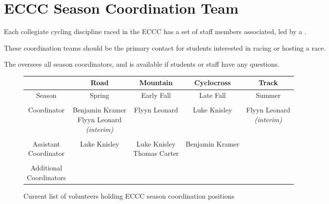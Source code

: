 \section[ECCC Season Team]{ECCC Season Coordination Team}
\label{role:eccc_coordination_team}

Each collegiate cycling discipline raced in the ECCC has a set of staff members associated, led by
a .

These coordination teams should be the primary contact for students interested in racing or hosting a race.

The  oversees all season coordinators, and is available if students or staff have any questions.

\begin{figure*}[h!]
  \caption{Current list of volunteers holding ECCC season coordination positions}
  \begin{tabular}{c | c | c | c | c}
    \toprule
    &
    Road &
    Mountain &
    Cyclocross & Track
    \\
    \midrule
    Season &
    Spring &
    Early Fall &
    Late Fall &
    Summer \\

    \midrule \\

    Coordinator &
    \makecell{Benjamin Kramer \\ Flyyn Leonard\\\textit{(interim)}} &
    Flyyn Leonard
    & Luke Knisley
    & \makecell{Flyyn Leonard\\\textit{(interim)}} \\

    \midrule \\

    \makecell{Assistant\\Coordinator} &
    Luke Knisley &
    \makecell{Luke Knisley \\ Thomas Carter} &
    Benjamin Kramer & \\

    \midrule \\

    \makecell{Additional\\Coordinators} & & & & \\

    \bottomrule
  \end{tabular}
\end{figure*}



